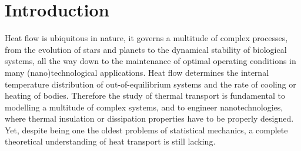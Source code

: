 \chapter{Introduction}  \label{ch:intro}

\vspace{1cm}

Heat flow is ubiquitous in nature, it governs a multitude of complex processes, from the evolution of stars and planets to the dynamical stability of biological systems, all the way down to the maintenance of optimal operating conditions in many (nano)technological applications. 
Heat flow determines the internal temperature distribution of out-of-equilibrium systems and the rate of cooling or heating of bodies. 
Therefore the study of thermal transport is fundamental to modelling a multitude of complex systems, and to engineer nanotechnologies, where thermal insulation or dissipation properties have to be properly designed. 
Yet, despite being one the oldest problems of statistical mechanics, a complete theoretical understanding of heat transport is still lacking. 


